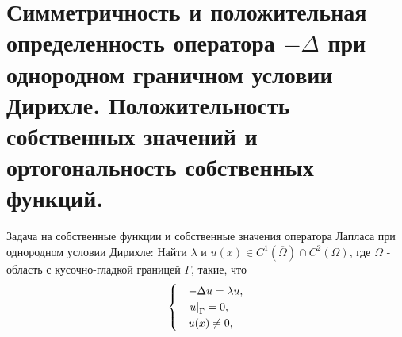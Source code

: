 \section{Симметричность и положительная определенность оператора $-\Delta$ при однородном граничном условии Дирихле. Положительность собственных значений и ортогональность собственных функций.}
Задача на собственные функции и собственные значения оператора Лапласа при однородном условии Дирихле:
Найти $\lambda$ и $u(x) \in C^1(\overline{\Omega}) \cap C^2(\Omega)$, где $\Omega$ - область с кусочно-гладкой границей $\Gamma$, такие, что
\[
\begin{cases}
&- \Delta u= \lambda u,\\
& \left. u\right|_{\Gamma}=0,\\
& u(x) \neq 0,
\end{cases} 
\]

